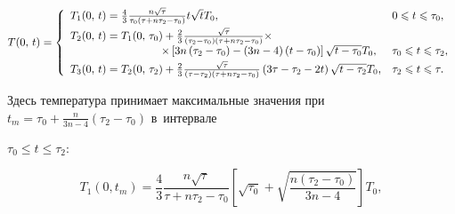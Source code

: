 \begin{equation}

\label{gurevs:eq13}

T(0,\,t) = \left\{ {\begin{array}{ll}

 T_1 (0,\,t) = \frac{4}{3}\frac{n\sqrt \tau }{\tau _0 \left( {\tau + n\tau _2 

- \tau _0 } \right)}t\sqrt t T_0 ,

& 

0 \leqslant t \leqslant \tau _0, \vspace{1mm}

\\ 

 T_2 (0,\,t) = T_1 (0,\,\tau _0 ) + \frac{2}{3}\frac{\sqrt \tau }{\left( {\tau 

_2 - \tau _0 } \right)\left( {\tau + n\tau _2 - \tau _0 } \right)} \times\\ 

\qquad \; \qquad \qquad  \qquad \times\left[ {3n\left( {\tau _2 - \tau _0 } 

\right) - \left( {3n - 4} \right)\left( {t - \tau _0 } \right)} \right]\sqrt 

{t - \tau _0 } T_0 , &

\tau _0 \leqslant t \leqslant \tau _2, \vspace{1mm}\\ 

 T_3 (0,\,t) = T_2 (0,\,\tau _2 ) + \frac{2}{3}\frac{\sqrt \tau }{\left( {\tau - 

\tau _2 } \right)\left( {\tau + n\tau _2 - \tau _0 } \right)}\left( {3\tau - 

\tau _2 - 2t} \right)\sqrt {t - \tau _2 } T_0 , &

\tau _2 \leqslant t \leqslant \tau.

 \end{array}} \right.

\end{equation}







\noindent

Здесь температура принимает максимальные значения при $t_m = \tau _0 + 

\frac{n}{3n - 4} \left( {\tau _2 - \tau _0 } \right) $ в~интервале 

$\tau _0 \leqslant t \leqslant \tau _2 $:

\begin{equation}

\label{gurevs:eq14}

T_1 (0,t_m ) = \frac{4}{3}\frac{n\sqrt \tau }{\tau + n\tau _2 - \tau _0 

}\left[ {\sqrt {\tau _0 } + \sqrt {\frac{n\left( {\tau _2 - \tau _0 } 

\right)}{3n - 4}} } \right]T_0 ,

\end{equation}

